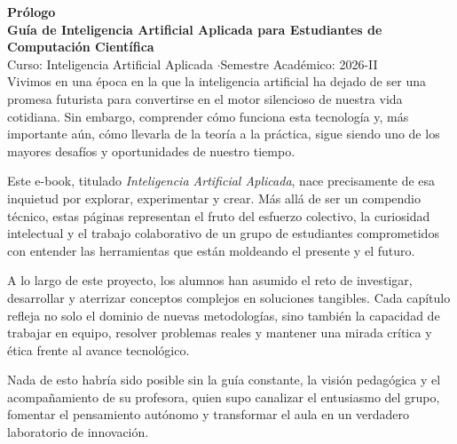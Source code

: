\documentclass[12pt, a4paper]{article}
\begin{document}
\makeatletter
{}
\makeatother

\newpage
{} 

{}

\vspace*{0.3cm}
{\Huge \textbf{Prólogo}}\\[0.25cm]
{\large\sffamily\textbf{\textcolor{unmsm_red}{Guía de Inteligencia Artificial Aplicada para Estudiantes de Computación Científica}}}\\[0.12cm]
{\small\sffamily\textcolor{unmsm_gray}{Curso: Inteligencia Artificial Aplicada \quad$\cdot$\quad Semestre Académico: 2026-II}}\\[0.4cm]

Vivimos en una época en la que la inteligencia artificial ha dejado de ser una promesa futurista para convertirse en el motor silencioso de nuestra vida cotidiana. Sin embargo, comprender cómo funciona esta tecnología y, más importante aún, cómo llevarla de la teoría a la práctica, sigue siendo uno de los mayores desafíos y oportunidades de nuestro tiempo.

Este e-book, titulado \textit{\guillemotleft Inteligencia Artificial Aplicada\guillemotright}, nace precisamente de esa inquietud por explorar, experimentar y crear. Más allá de ser un compendio técnico, estas páginas representan el fruto del esfuerzo colectivo, la curiosidad intelectual y el trabajo colaborativo de un grupo de estudiantes comprometidos con entender las herramientas que están moldeando el presente y el futuro.

A lo largo de este proyecto, los alumnos han asumido el reto de investigar, desarrollar y aterrizar conceptos complejos en soluciones tangibles. Cada capítulo refleja no solo el dominio de nuevas metodologías, sino también la capacidad de trabajar en equipo, resolver problemas reales y mantener una mirada crítica y ética frente al avance tecnológico.

Nada de esto habría sido posible sin la guía constante, la visión pedagógica y el acompañamiento de su profesora, quien supo canalizar el entusiasmo del grupo, fomentar el pensamiento autónomo y transformar el aula en un verdadero laboratorio de innovación.
\end{document}
